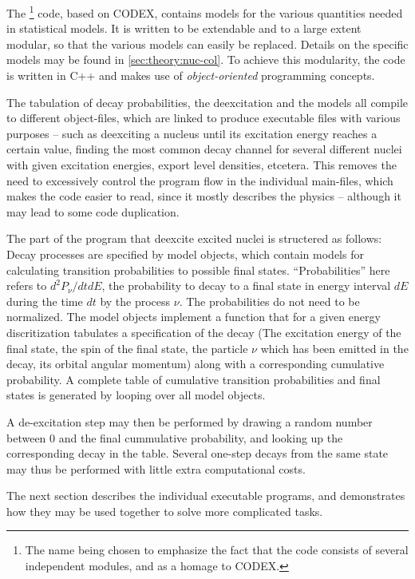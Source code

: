The \codename{}\footnote{The name being chosen to emphasize the fact that the code consists of several independent modules, and as a homage to CODEX.} code, based on CODEX\cite{gollerthan:1988:thesis}, contains models for the various quantities needed in statistical models. It is written to be extendable and to a large extent modular, so that the various models can easily be replaced. Details on the specific models may be found in \autoref{sec:theory:nuc-col}.
To achieve this modularity, the code is written in C++ and makes use of \emph{object-oriented} programming concepts. 

The tabulation of decay probabilities, the deexcitation and the models all compile to different object-files, which are linked to produce executable files with various purposes -- such as deexciting a nucleus until its excitation energy reaches a certain value, finding the most common decay channel for several different nuclei with given excitation energies, export level densities, etcetera. 
This removes the need to excessively control the program flow in the individual main-files, which makes the code easier to read, since it mostly describes the physics -- although it may lead to some code duplication.

The part of the program that deexcite excited nuclei is structered as follows:
 Decay processes are specified by model objects, which contain models for calculating transition probabilities to possible final states. ``Probabilities'' here refers to $d^2 P_\nu/dtdE$, the probability to decay to a final state in energy interval $dE$ during the time $dt$ by the process $\nu$. The probabilities do not need to be normalized.
The model objects implement a function that for a given energy discritization tabulates a specification of the decay (The excitation energy of the final state, the spin of the final state, the particle $\nu$ which has been emitted in the decay, its orbital angular momentum) along with a corresponding cumulative probability. A complete table of cumulative transition probabilities and final states is generated by looping over all model objects.

 A de-excitation step may then be performed by drawing a random number between $0$ and the final cummulative probability, and looking up the corresponding decay in the table. Several one-step decays from the same state may thus be performed with little extra computational costs.

The next section describes the individual executable programs, and demonstrates how they may be used together to solve more complicated tasks.

